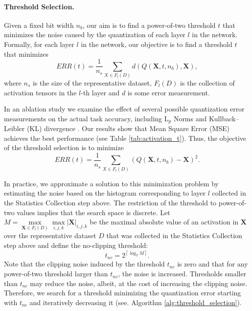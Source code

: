 \documentclass{article}
\newcommand{\brackets}[1]{\left(#1\right)}
\newcommand{\abs}[1]{\left|#1\right|}
\newcommand{\matsym}[1]{\mathbf{#1}}
\newcommand{\ceil}[1]{\left\lceil#1\right\rceil}
\begin{document}
\paragraph{Threshold Selection.}   



Given a fixed bit width $n_b$, our aim is to find a power-of-two threshold $t$ that minimizes the noise caused by the quantization of each layer $l$ in the network. Formally, for each layer $l$ in the network, our objective is to find a threshold $t$ that minimizes 
\begin{equation}\label{equ:err}
    ERR\brackets{t}=\frac{1}{n_s}\sum_{X\in F_l(D)}d\brackets{Q(\matsym{X},t,n_b),\matsym{X}},
\end{equation}
where $n_s$ is the size of the representative dataset, $F_l(D)$ is the collection of activation tensors in the $l$-th layer and $d$ is some error measurement.




In an ablation study we examine the effect of several possible quantization error measurements on the actual task accuracy, including $\mathrm{L}_p$ Norms \cite{nahshan2019loss} and Kullback–Leibler (KL) divergence \cite{szymon}.
Our results show that Mean Square Error (MSE) \cite{nahshan2019loss} achieves the best performance (see Table \ref{tab:activation_t}). 
Thus, the objective of the threshold selection is to minimize
\begin{equation}
    ERR\brackets{t}=\frac{1}{n_s}\sum_{X\in F_l(D)}\brackets{Q(\matsym{X},t,n_b)-\matsym{X}}^2.
\end{equation}









In practice, we approximate a solution to this minimization problem by estimating the noise based on the histogram corresponding to layer $l$ collected in the Statistics Collection step above. The restriction of the threshold to power-of-two values implies that the search space is discrete. 
Let  $M=\max\limits_{\matsym{X}\in F_l(D)}\max\limits_{i,j,k}\abs{\matsym{X}}_{i,j,k}$ be the maximal absolute value of an activation in $\matsym{X}$ over the representative dataset $D$ that was collected in the Statistics Collection step above and define the no-clipping threshold:
\begin{equation}\label{eq:no_clipping_a}
    t_{nc}=2^{\ceil{\log_2 M}}.
\end{equation}  
Note that the clipping noise induced by the threshold $t_{nc}$ is zero and that for any power-of-two threshold larger than $t_{nc}$, the noise is increased.
Thresholds smaller than $t_{nc}$ may reduce the noise, albeit, at the cost of increasing the clipping noise. 
Therefore, we search for a threshold minimizing the quantization error starting with $t_{nc}$ and iteratively decreasing it (see. Algorithm \ref{alg:threshold_selection}).
\end{document}
